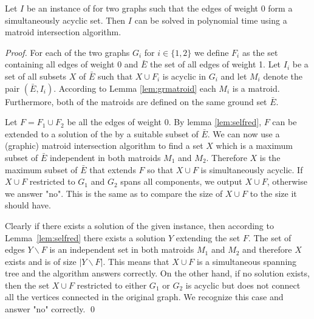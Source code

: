 \begin{lemma}\label{lem:acyclic01}
Let $I$ be an instance of \POISMST for two graphs such that the edges of weight 0 form a simultaneously acyclic set. Then $I$ can be solved in polynomial time using a matroid intersection algorithm. 
\end{lemma}
\begin{proof}
For each of the two graphs $G_i$ for $i \in \{1,2\}$ we define $F_i$ as the set containing all edges of weight 0 and $\bar{E}$ the set of all edges of weight 1. Let $I_i$ be a set of all subsets $X$ of $\bar{E}$ such that $X \cup F_i$ is acyclic in $G_i$ and let $M_i$ denote the pair $(\bar{E},I_i)$. According to Lemma \ref{lem:grmatroid} each $M_i$ is a matroid. Furthermore, both of the matroids are defined on the same ground set $\bar{E}$.

Let $F = F_1 \cup F_2$ be all the edges of weight 0. By lemma \ref{lem:selfred}, $F$ can be extended to a solution of the \POISMST by a suitable subset of $\bar{E}$. We can now use a (graphic) matroid intersection algorithm to find a set $X$ which is a maximum subset of $\bar{E}$ independent in both matroids $M_1$ and $M_2$. Therefore $X$ is the maximum subset of $\bar{E}$ that extends $F$ so that $X \cup F$ is simultaneously acyclic. If $X \cup F$ restricted to $G_1$ and $G_2$ spans all components, we output $X \cup F$, otherwise we answer "no". This is the same as to compare the size of $X \cup F$ to the size it should have.

Clearly if there exists a solution of the given \POISMST instance, then according to Lemma~\ref{lem:selfred} there exists a solution $Y$ extending the set $F$. The set of edges $Y \backslash F$ is an independent set in both matroids $M_1$ and $M_2$ and therefore $X$ exists and is of size $|Y \backslash F|$. This means that $X \cup F$ is a simultaneous spanning tree and the algorithm answers correctly. On the other hand, if no solution exists, then the set $X \cup F$ restricted to either $G_1$ or $G_2$ is acyclic but does not connect all the vertices connected in the original graph. We recognize this case and answer "no" correctly. \qed
\end{proof}

